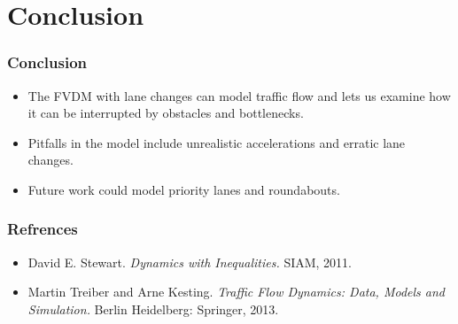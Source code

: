 \documentclass{beamer}
\begin{document}
\section{Conclusion}
\begin{frame}
  \frametitle{Conclusion}
  \begin{itemize}
    \item The FVDM with lane changes can model traffic flow and lets us examine how it can be interrupted by obstacles and bottlenecks. 
    \item Pitfalls in the model include unrealistic accelerations and erratic lane changes.
    \item Future work could model priority lanes and roundabouts.
  \end{itemize}
\end{frame}

\begin{frame}
  \frametitle{Refrences}
  \begin{itemize}
    \item David E. Stewart. \textit{Dynamics with Inequalities.} SIAM, 2011. 
    \item Martin Treiber and Arne Kesting. \textit{Traffic Flow Dynamics: Data,
    Models and Simulation.} Berlin Heidelberg: Springer, 2013.
  \end{itemize}
\end{frame}
\end{document}

